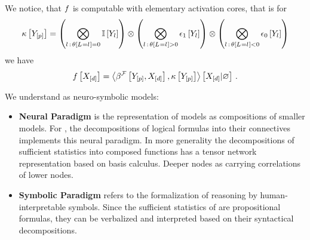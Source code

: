 We notice, that $f$ is computable with elementary activation cores, that is for
\begin{align*}
    \kappa\left[Y_{[p]}\right]
    = \left(\bigotimes_{l\,:\,\theta\left[L_{}=l_{}\right]=0} \mathbb{I}\left[Y_{l}\right]\right)
    \otimes \left(\bigotimes_{l\,:\,\theta\left[L_{}=l_{}\right]>0} \epsilon_1\left[Y_{l}\right]\right)
    \otimes \left(\bigotimes_{l\,:\,\theta\left[L_{}=l_{}\right]<0} \epsilon_0\left[Y_{l}\right]\right)
\end{align*}
we have
\begin{align*}
    f\left[X_{[d]}\right] =
    \left\langle \beta^{\mathcal{F}}\left[Y_{[p]},X_{[d]}\right],\kappa\left[Y_{[p]}\right]\right\rangle \left[ X_{[d]} | \varnothing \right] \, .
\end{align*}



We understand \HybridLogicNetworks{} as neuro-symbolic models:
\begin{itemize}
    \item \textbf{Neural Paradigm} is the representation of models as compositions of smaller models.
    For \HybridLogicNetworks{}, the decompositions of logical formulas into their connectives implements this neural paradigm.
    In more generality the decompositions of sufficient statistics into composed functions has a tensor network representation based on basis calculus.
    Deeper nodes as carrying correlations of lower nodes.
    \item \textbf{Symbolic Paradigm} refers to the formalization of reasoning by human-interpretable symbols.
    Since the sufficient statistics of \HybridLogicNetworks{} are propositional formulas, they can be verbalized and interpreted based on their syntactical decompositions.
\end{itemize}

